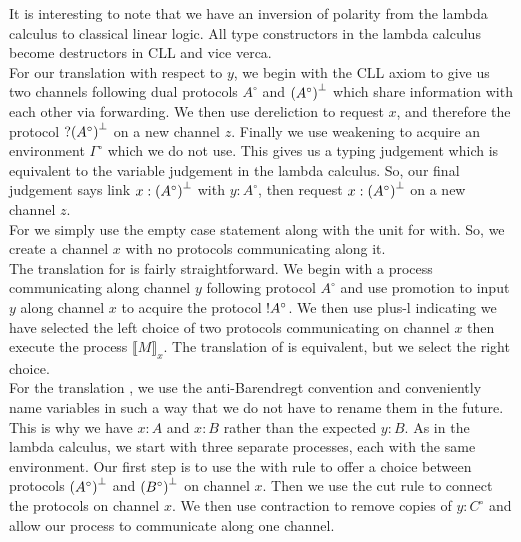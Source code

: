 \noindent
It is interesting to note that we have an inversion of polarity from the lambda calculus 
to classical linear logic. All type constructors in the lambda calculus become destructors 
in CLL and vice verca. \\ %

\noindent
For our translation  with respect to $y$, we begin with the CLL axiom to  
give us two channels following dual protocols $A^\circ$ and $\negg{(A^\circ)}$ which 
share information with each other via forwarding. We then use 
dereliction to request $x$, and therefore the protocol $\whynot \negg{(A^\circ)}$ 
on a new channel $z$. Finally we use weakening to acquire an environment $\Gamma^\circ$ 
which we do not use. This gives us a typing judgement which is equivalent to the variable 
judgement in the lambda calculus. So, our final judgement says link 
$x: \negg{(A^\circ)}$ with $y: A^\circ$, then request $x: \negg{(A^\circ)}$ on a new channel $z$. \\

\noindent
For  we simply use the empty case statement along with the unit for with. 
So, we create a channel $x$ with no protocols communicating along it. \\

\noindent
The translation for  is fairly straightforward. We begin with a process communicating 
along channel $y$ following protocol $A^\circ$ and use promotion to input $y$ along channel $x$ to 
acquire the protocol $\textrm{!} A^\circ$. We then use plus-l indicating we have selected the left choice of 
two protocols communicating on channel $x$ then execute the process $\llbracket M \rrbracket_x$. 
The translation of  is equivalent, but we select the right choice. \\

\noindent
For the translation , we use the anti-Barendregt convention and conveniently 
name variables in such a way that we do not have to rename them in the future. This is why 
we have $x: A$ and $x: B$ rather than the expected $y: B$. As in the 
lambda calculus, we start with three separate processes, each with the same environment. Our 
first step is to use the with rule to offer a choice between protocols $\negg{(A^\circ)}$ and 
$\negg{(B^\circ)}$ on channel $x$. Then we use the cut rule to connect the protocols on channel 
$x$. We then use contraction to remove copies of $y: C^\circ$ 
and allow our process to communicate along one channel. \\

